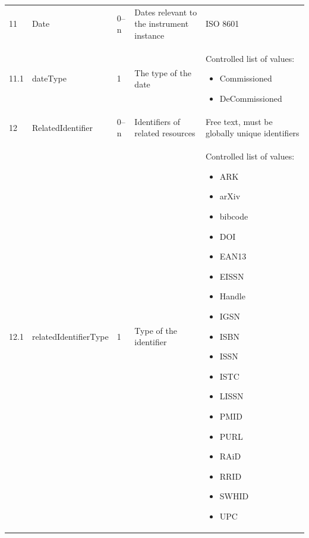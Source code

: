 \documentclass[titlepage=true,twoside=false,DIV=13]{scrartcl}
\begin{document}
\begin{longtable}{|l|p{\propcolw}|l|p{}|p{\valcolw}|}
\begin{minipage}[t]{\valcolw}
           \end{minipage} \\
  \hline
  11     & Date                                 & 0--n
         & Dates relevant to the instrument instance & ISO 8601 \\
  \hline
  11.1   & dateType                             & 1
         & The type of the date
         & \begin{minipage}[t]{\valcolw}
             Controlled list of values:
             \begin{itemize}[nosep,leftmargin=3.5ex]
             \item Commissioned
             \item DeCommissioned
             \end{itemize}
             \vspace{1ex}
           \end{minipage} \\
  \hline
  12     & RelatedIdentifier                    & 0--n
         & Identifiers of related resources
         & Free text, must be globally unique identifiers \\
  \hline
  12.1   & relatedIdentifierType                & 1
         & Type of the identifier
         & \begin{minipage}[t]{\valcolw}
             Controlled list of values:
             \begin{itemize}[nosep,leftmargin=3.5ex]
             \item ARK
             \item arXiv
             \item bibcode
             \item DOI
             \item EAN13
             \item EISSN
             \item Handle
             \item IGSN
             \item ISBN
             \item ISSN
             \item ISTC
             \item LISSN
             \item PMID
             \item PURL
             \item RAiD
             \item RRID
             \item SWHID
             \item UPC

\end{itemize}
\end{minipage}
\end{longtable}
\end{document}
